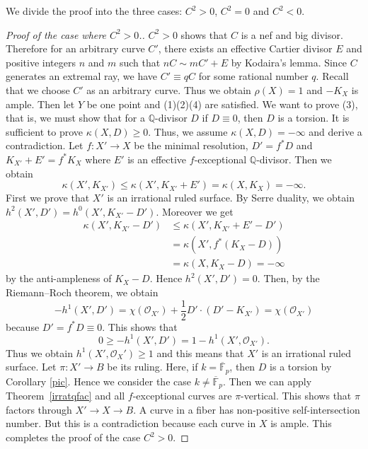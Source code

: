 \documentclass[12pt,twoside]{amsart}
\theoremstyle{definition}
\newcommand{\Q}{$\mathbb{Q}$}
\newcommand{\fff}{\overline{\mathbb{F}}_p}
\begin{document}
We divide the proof into the three cases: 
$C^2>0$, $C^2=0$ and $C^2<0$. 


\begin{proof}[Proof of the case where $C^2>0$.]
$C^2>0$ shows that $C$ is a nef and big divisor. 
Therefore for an arbitrary curve $C'$, 
there exists an effective Cartier divisor $E$ and 
positive integers $n$ and $m$ such that 
$nC \sim mC'+E$ by Kodaira's lemma. 
Since $C$ generates an extremal ray, 
we have $C' \equiv qC$ for some rational number $q$. 
Recall that we choose $C'$ as an arbitrary curve. 
Thus we obtain $\rho(X)=1$ and $-K_X$ is ample. 
Then let $Y$ be one point and 
(1)(2)(4) are satisfied. 
We want to prove (3), that is, 
we must show that for a \Q-divisor $D$ if $D \equiv 0$, then $D$ is a torsion. 
It is sufficient to prove $\kappa(X, D) \geq 0$. 
Thus, we assume $\kappa(X, D) =-\infty$ and derive a contradiction. 
Let $f:X' \to X$ be the minimal resolution, 
$D'=f^*D$ and 
$K_{X'}+E'=f^*K_X$ where $E'$ is an effective $f$-exceptional \Q-divisor. 
Then we obtain
$$\kappa(X', K_{X'})\leq \kappa(X', K_{X'}+E')=\kappa(X, K_X)=-\infty.$$
First we prove that $X'$ is an irrational ruled surface. 
By Serre duality, we obtain 
$h^2(X', D')=
h^0(X', K_{X'}-D')$. 
Moreover we get 
\begin{align*}
\kappa(X', K_{X'}-D') &\leq 
\kappa(X', K_{X'}+E'-D')\\ &=
\kappa(X', f^*(K_{X}-D))\\ & =
\kappa(X, K_X-D)=-\infty
\end{align*}
by the anti-ampleness of $K_X-D$. 
Hence $h^2(X', D')=0$. 
Then, by the Riemann--Roch theorem, we obtain 
$$-h^1(X', D')=\chi(\mathcal{O}_{X'})+\frac{1}{2}D'\cdot(D'-K_{X'})=\chi(\mathcal{O}_{X'})$$ 
because $D'=f^*D\equiv 0$. 
This shows that 
$$0 \geq -h^1(X', D') = 1-h^1(X', \mathcal{O}_{X'}).$$ 
Thus we obtain  $h^1(X', \mathcal{O}_X') \geq 1$ 
and this means that $X'$ is an irrational ruled surface. 
Let $\pi:X' \to B$ be its ruling. 
Here, if $k=\fff$, then $D$ is a torsion by Corollary \ref{pic}. 
Hence we consider the case $k \neq \fff$. 
Then we can apply Theorem~\ref{irratqfac} and 
all $f$-exceptional curves are $\pi$-vertical. 
This shows that $\pi$ factors through 
$X' \to X \to B$. 
A curve in a fiber has non-positive self-intersection number. 
But this is a contradiction because 
each curve in $X$ is ample. 
This completes the proof of the case $C^2>0$. 
\end{proof}
\end{document}
